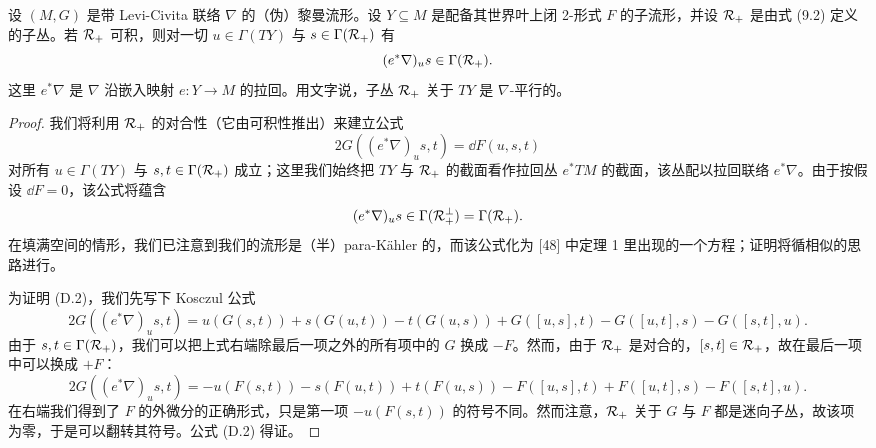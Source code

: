
\begin{proposition}[7] 设 $(M,G)$ 是带 Levi-Civita 联络 $\nabla$ 的（伪）黎曼流形。设 $Y\subseteq M$ 是配备其世界叶上闭 2-形式 $F$ 的子流形，并设 $\mathcal{R}_+$ 是由式 (9.2) 定义的子丛。若 $\mathcal{R}_+$ 可积，则对一切 $u\in\Gamma(TY)$ 与 $s\in\Gamma(\mathcal{R}_+)$ 有
\[
  (e^*\nabla)_u s\in\Gamma(\mathcal{R}_+).
\]
这里 $e^*\nabla$ 是 $\nabla$ 沿嵌入映射 $e:Y\to M$ 的拉回。用文字说，子丛 $\mathcal{R}_+$ 关于 $TY$ 是 $\nabla$-平行的。\end{proposition}

\begin{proof}
我们将利用 $\mathcal{R}_+$ 的对合性（它由可积性推出）来建立公式
\begin{equation}
  2G((e^*\nabla)_u s,t)=\dd F(u,s,t) \tag{D.2}
\end{equation}
对所有 $u\in\Gamma(TY)$ 与 $s,t\in\Gamma(\mathcal{R}_+)$ 成立；这里我们始终把 $TY$ 与 $\mathcal{R}_+$ 的截面看作拉回丛 $e^*TM$ 的截面，该丛配以拉回联络 $e^*\nabla$。由于按假设 $\dd F=0$，该公式将蕴含
\[
  (e^*\nabla)_u s\in\Gamma(\mathcal{R}_+^\perp)=\Gamma(\mathcal{R}_+).
\]
在填满空间的情形，我们已注意到我们的流形是（半）para-Kähler 的，而该公式化为 [48] 中定理 1 里出现的一个方程；证明将循相似的思路进行。

为证明 (D.2)，我们先写下 Kosczul 公式
\[
  2G((e^*\nabla)_u s,t)=u(G(s,t))+s(G(u,t))-t(G(u,s))+G([u,s],t)-G([u,t],s)-G([s,t],u).
\]
由于 $s,t\in\Gamma(\mathcal{R}_+)$，我们可以把上式右端除最后一项之外的所有项中的 $G$ 换成 $-F$。然而，由于 $\mathcal{R}_+$ 是对合的，$[s,t]\in\mathcal{R}_+$，故在最后一项中可以换成 $+F$：
\[
  2G((e^*\nabla)_u s,t)=-u(F(s,t))-s(F(u,t))+t(F(u,s))-F([u,s],t)+F([u,t],s)-F([s,t],u).
\]
在右端我们得到了 $F$ 的外微分的正确形式，只是第一项 $-u(F(s,t))$ 的符号不同。然而注意，$\mathcal{R}_+$ 关于 $G$ 与 $F$ 都是迷向子丛，故该项为零，于是可以翻转其符号。公式 (D.2) 得证。\end{proof}



